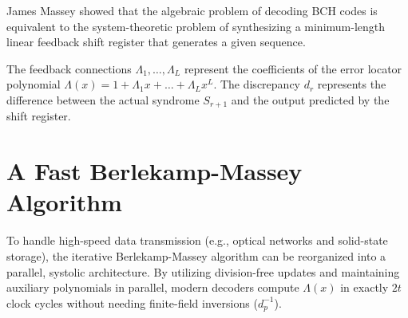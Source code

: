\documentclass[12pt,a4paper]{article}
\begin{document}
James Massey showed that the algebraic problem of decoding BCH codes is equivalent to the system-theoretic problem of synthesizing a minimum-length linear feedback shift register that generates a given sequence.

\begin{tcolorbox}[tikzbox, title={Massey's LFSR Synthesis Model}]
\centering
{}
\end{tcolorbox}

The feedback connections $\Lambda_1, \dots, \Lambda_L$ represent the coefficients of the error locator polynomial $\Lambda(x) = 1 + \Lambda_1 x + \dots + \Lambda_L x^L$. The discrepancy $d_r$ represents the difference between the actual syndrome $S_{r+1}$ and the output predicted by the shift register.

\section{A Fast Berlekamp-Massey Algorithm}

To handle high-speed data transmission (e.g., optical networks and solid-state storage), the iterative Berlekamp-Massey algorithm can be reorganized into a parallel, systolic architecture.
By utilizing division-free updates and maintaining auxiliary polynomials in parallel, modern decoders compute $\Lambda(x)$ in exactly $2t$ clock cycles without needing finite-field inversions ($d_p^{-1}$).
\end{document}
